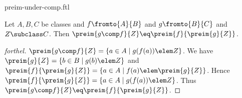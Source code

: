 \documentclass{naproche-library}
\begin{document}
\begin{smodule}[title=Preimages under Compositions]{preim-under-comp.ftl}


\begin{proposition}[forthel,id=PreimOfCompProp]
  Let $A, B, C$ be classes and $f \fromto{A}{B}$ and $g \fromto{B}{C}$ and $Z \subclass C$.
  Then $\preim{g \comp f}{Z} \eq \preim{f}{\preim{g}{Z}}$.
\end{proposition}
\begin{proof}[forthel]
  $\preim{g \comp f}{Z} = \{ a \in A \mid g(f(a)) \elem Z \}$.
  We have $\preim{g}{Z} = \{ b \in B \mid g(b) \elem Z \}$ and $\preim{f}{\preim{g}{Z}} = \{ a \in A \mid f(a) \elem \preim{g}{Z} \}$.
  Hence $\preim{f}{\preim{g}{Z}} = \{ a \in A \mid g(f(a)) \elem Z \}$.
  Thus $\preim{g \comp f}{Z} \eq \preim{f}{\preim{g}{Z}}$.
\end{proof}

\end{smodule}
\end{document}
